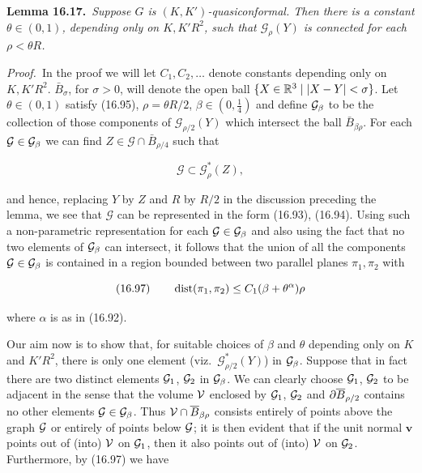 \noindent\textbf{Lemma 16.17.}\ \emph{Suppose $G$ is $(K,K')$-quasiconformal. Then there is a constant $\theta\in(0,1)$, depending only on $K,K'R^2$, such that $\mathscr G_\rho(Y)$ is connected for each $\rho<\theta R$.}

\smallskip

\noindent\emph{Proof.}\ In the proof we will let $C_1,C_2,\ldots$ denote constants depending only on $K,K'R^2$. $\bar B_\sigma$, for $\sigma>0$, will denote the open ball $\{X\in\mathbb{R}^3\mid |X-Y|<\sigma\}$. Let $\theta\in(0,1)$ satisfy (16.95), $\rho=\theta R/2$, $\beta\in(0,\frac14)$ and define $\mathcal{G}_\beta$ to be the collection of those components of $\mathscr G_{\rho/2}(Y)$ which intersect the ball $\bar B_{\beta\rho}$. For each $\mathcal G\in\mathcal{G}_\beta$ we can find $Z\in\mathcal G\cap \bar B_{\rho/4}$ such that

\[
\mathcal G\subset \mathscr G_{\rho}^{*}(Z),
\]

and hence, replacing $Y$ by $Z$ and $R$ by $R/2$ in the discussion preceding the lemma, we see that $\mathcal G$ can be represented in the form (16.93), (16.94). Using such a non-parametric representation for each $\mathcal G\in\mathcal{G}_\beta$ and also using the fact that no two elements of $\mathcal{G}_\beta$ can intersect, it follows that the union of all the components $\mathcal G\in\mathcal{G}_\beta$ is contained in a region bounded between two parallel planes $\pi_1,\pi_2$ with

\[
(16.97)\qquad \operatorname{dist}(\pi_1,\pi_2)\le C_1(\beta+\theta^\alpha)\rho
\]

where $\alpha$ is as in (16.92).



\pagestyle{empty}



Our aim now is to show that, for suitable choices of $\beta$ and $\theta$ depending only
on $K$ and $K'R^2$, there is only one element (viz.\ $\mathscr{G}_{\rho/2}^*(Y)$) in $\mathcal{G}_\beta$.
Suppose that in fact there are two distinct elements $\mathcal{G}_1$, $\mathcal{G}_2$ in $\mathcal{G}_\beta$.
We can clearly choose $\mathcal{G}_1$, $\mathcal{G}_2$ to be adjacent in the sense that the volume
$\mathcal{V}$ enclosed by $\mathcal{G}_1$, $\mathcal{G}_2$ and $\partial \overline{B}_{\rho/2}$ contains no other
elements $\mathcal{G} \in \mathcal{G}_\beta$. Thus $\mathcal{V}\cap \overline{B}_{\beta\rho}$ consists entirely of points
above the graph $\mathcal{G}$ or entirely of points below $\mathcal{G}$; it is then evident that if the unit
normal $\mathbf{v}$ points out of (into) $\mathcal{V}$ on $\mathcal{G}_1$, then it also points out of (into)
$\mathcal{V}$ on $\mathcal{G}_2$. Furthermore, by (16.97) we have


